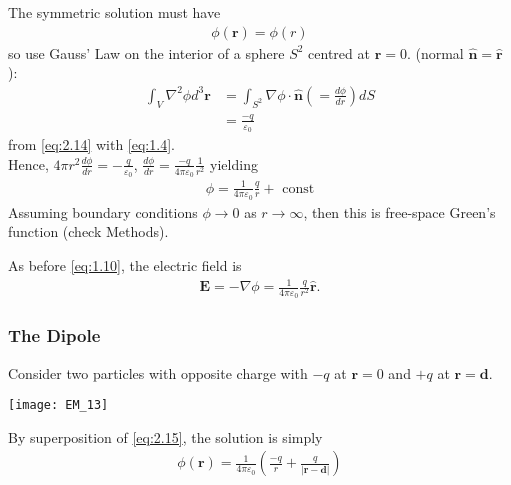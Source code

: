 \documentclass[a4paper]{article}
\begin{document}
The symmetric solution must have
\begin{equation*}
\begin{aligned}
\phi(\mathbf{r}) = \phi(r)
\end{aligned}
\end{equation*}
so use Gauss' Law on the interior of a sphere $S^2$ centred at $\mathbf{r} = 0$. (normal $\mathbf{\hat{n}} = \mathbf{\hat{r}}$):
\begin{equation*}
\begin{aligned}
\int_V \nabla^2 \phi d^3 \mathbf{r} &= \int_{S^2} \nabla \phi \cdot \mathbf{\hat{n}} (=\frac{d\phi}{dr}) dS\\
&=\frac{-q}{\varepsilon_0}
\end{aligned}
\end{equation*}
from \eqref{eq:2.14} with \eqref{eq:1.4}.\\
Hence, $4\pi r^2 \frac{d\phi}{dr} = -\frac{q}{\varepsilon_0}$, $\frac{d\phi}{dr} = \frac{-q}{4\pi \varepsilon_0}\frac{1}{r^2}$ yielding
\begin{equation*}\tag{2.15} \label{eq:2.15}
\begin{aligned}
\phi = \frac{1}{4\pi \varepsilon_0}\frac{q}{r} + \text{ const}
\end{aligned}
\end{equation*}
Assuming boundary conditions $\phi \to 0 $ as $r \to \infty$, then this is free-space Green's function (check Methods).

As before \eqref{eq:1.10}, the electric field is
\begin{equation*}
\begin{aligned}
\mathbf{E} = -\nabla \phi = \frac{1}{4\pi \varepsilon_0} \frac{q}{r^2} \mathbf{\hat{r}}.
\end{aligned}
\end{equation*}

\subsubsection{The Dipole}
Consider two particles with opposite charge with $-q$ at $\mathbf{r} = 0$ and $+q$ at $\mathbf{r} = \mathbf{d}$.

\texttt{[image: EM\_13]}

By superposition of \eqref{eq:2.15}, the solution is simply
\begin{equation*}\tag{2.16} \label{eq:2.16}
\begin{aligned}
\phi(\mathbf{r}) = \frac{1}{4\pi \varepsilon_0} \left( \frac{-q}{r} + \frac{q}{|\mathbf{r} - \mathbf{d}|}\right)
\end{aligned}
\end{equation*}
\end{document}
